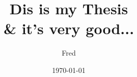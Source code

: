\documentclass{book}
\begin{document}
\title{Dis is my Thesis\\ \& it's very good...}
\author{Fred}            %
\date{\today}%
\maketitle

\tableofcontents






\end{document}
